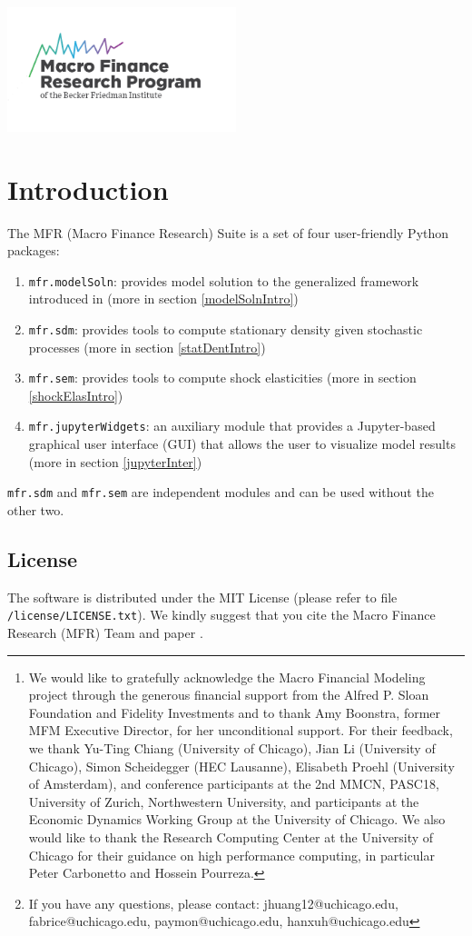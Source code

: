 \documentclass[12pt]{article}
\title{\softwareFullName}
\author{Lars Peter Hansen, Joseph Huang, Paymon Khorrami, Fabrice Tourre\footnote{We would like to gratefully acknowledge the Macro Financial Modeling project through the generous financial support from the Alfred P. Sloan Foundation and Fidelity Investments and to thank Amy Boonstra, former MFM Executive Director, for her unconditional support. For their feedback, we thank Yu-Ting Chiang (University of Chicago), Jian Li (University of Chicago), Simon Scheidegger (HEC Lausanne), Elisabeth Proehl (University of Amsterdam), and conference participants at the 2nd MMCN, PASC18, University of Zurich, Northwestern University, and participants at the Economic Dynamics Working Group at the University of Chicago. We also would like to thank the Research Computing Center at the University of Chicago for their guidance on high performance computing, in particular Peter Carbonetto and Hossein Pourreza.}}
\date{Version: 0.1.2\footnote{If you have any questions, please contact: jhuang12@uchicago.edu, fabrice@uchicago.edu, paymon@uchicago.edu, hanxuh@uchicago.edu}}
\newcommand{\softwareFullName}{MFR (Macro Finance Research) Suite\xspace}
\newcommand{\modelSolnProg}{mfr.modelSoln\xspace}
\newcommand{\jupyterWidgetsProg}{mfr.jupyterWidgets\xspace}
\newcommand{\sdmProg}{mfr.sdm\xspace}
\newcommand{\semProg}{mfr.sem\xspace}
\newcommand{\copyrightHolder}{Macro Finance Research (MFR) Team\xspace}
\begin{document}
\nocite{*}
\maketitle
\begin{center}
\includegraphics[width=0.5\textwidth]{mfrLogo}
\end{center}

\tableofcontents

\newpage
\section{Introduction}

The \softwareFullName is a set of four user-friendly Python packages:

\begin{enumerate}
\item \texttt{\modelSolnProg}: provides model solution to the generalized framework introduced in \citet{HKT} (more in section \ref{modelSolnIntro})
\item \texttt{\sdmProg}: provides tools to compute stationary density given stochastic processes (more in section \ref{statDentIntro})
\item \texttt{\semProg}: provides tools to compute shock elasticities (more in section \ref{shockElasIntro})
\item \texttt{\jupyterWidgetsProg}: an auxiliary module that provides a Jupyter-based graphical user interface (GUI) that allows the user to visualize model results (more in section \ref{jupyterInter})
\end{enumerate}

\texttt{\sdmProg} and \texttt{\semProg} are independent modules and can be used without the other two. 

\subsection{License}

The software is distributed under the MIT License (please refer to file \texttt{/license/LICENSE.txt}). We kindly suggest that you cite the  \copyrightHolder and paper \cite{HKT}.
\end{document}
